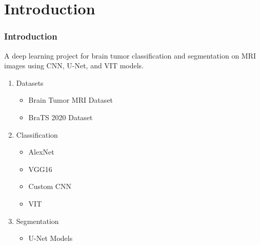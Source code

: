 \documentclass[../presentation.tex]{subfiles} %
\begin{document}
\section{Introduction} %

\begin{frame}

	\frametitle{Introduction}

	\begin{center}
  A deep learning project for brain tumor classification and segmentation on MRI images using CNN, U-Net, and VIT models.
	\end{center}

	\begin{enumerate}
		\item Datasets
			\begin{itemize}
				\item Brain Tumor MRI Dataset 
				\item BraTS 2020 Dataset 
			\end{itemize}
		\item Classification
			\begin{itemize}
				\item AlexNet
				\item VGG16
				\item Custom CNN
				\item VIT
			\end{itemize}
		\item Segmentation
			\begin{itemize}
				\item U-Net Models
			\end{itemize}
	\end{enumerate}

\end{frame}
\end{document}
